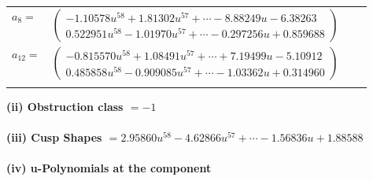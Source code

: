 \documentclass[1p]{elsarticle_modified}
\theoremstyle{definition}
\begin{document}
\begin{tabular}{m{7pt} m{180pt} m{7pt} m{180pt} }
\flushright $a_{8}=$&$\begin{pmatrix}-1.10578 u^{58}+1.81302 u^{57}+\cdots-8.88249 u-6.38263\\0.522951 u^{58}-1.01970 u^{57}+\cdots-0.297256 u+0.859688\end{pmatrix}$ \\
\flushright $a_{12}=$&$\begin{pmatrix}-0.815570 u^{58}+1.08491 u^{57}+\cdots+7.19499 u-5.10912\\0.485858 u^{58}-0.909085 u^{57}+\cdots-1.03362 u+0.314960\end{pmatrix}$\\&\end{tabular}
\flushleft \textbf{(ii) Obstruction class $= -1$}\\~\\
\flushleft \textbf{(iii) Cusp Shapes $= 2.95860 u^{58}-4.62866 u^{57}+\cdots-1.56836 u+1.88588$}\\~\\
\newpage\renewcommand{\arraystretch}{1}
\flushleft \textbf{(iv) u-Polynomials at the component}\newline \\
\end{document}

